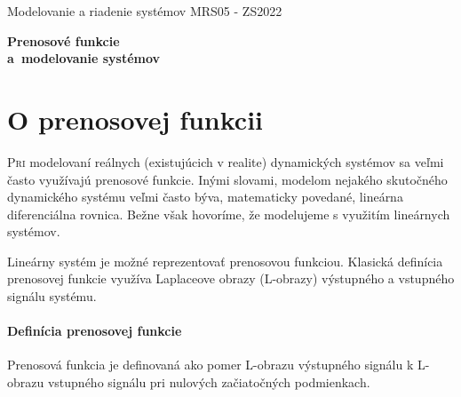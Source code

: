 \documentclass[a4paper, 10pt, ]{article}
\def\oznacenieCasti{MRS05 - ZS2022}
\begin{document}
\lstset{%
style=mystyle,
rangebeginprefix=\#\#\#\ cellB\ ,%
rangebeginsuffix=\ \#\#\#,%
rangeendprefix=\#\#\#\ cellE\ ,%
rangeendsuffix=\ \#\#\#,%
includerangemarker=false,
}




\fontsize{12pt}{22pt}\selectfont

\centerline{\textsf{Modelovanie a riadenie systémov} \hfill \textsf{\oznacenieCasti}}

\fontsize{18pt}{22pt}\selectfont





\begin{flushleft}
	\textbf{\textsf{Prenosové funkcie\\a~modelovanie systémov}}
\end{flushleft}





\normalsize

\bigskip

{\hypersetup{hidelinks}

\tableofcontents

}

\bigskip

\vspace{18pt}



\section{O prenosovej funkcii}

\lettrine[lines=3, nindent=0pt]{P}{ri}
modelovaní reálnych (existujúcich v realite) dynamických systémov sa veľmi často využívajú prenosové funkcie. Inými slovami, modelom nejakého skutočného dynamického systému veľmi často býva, matematicky povedané, lineárna diferenciálna rovnica. Bežne však hovoríme, že modelujeme s využitím lineárnych systémov.

\bigskip

\noindent
Lineárny systém je možné reprezentovať prenosovou funkciou. Klasická definícia prenosovej funkcie využíva Laplaceove obrazy (L-obrazy) výstupného a vstupného signálu systému.

\paragraph{Definícia prenosovej funkcie}

Prenosová funkcia je definovaná ako pomer L-obrazu výstupného signálu k L-obrazu vstupného signálu pri nulových začiatočných podmienkach.
\end{document}
